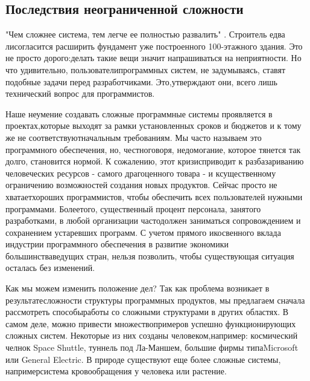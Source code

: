 \documentclass[10pt]{article}
\begin{document}
\subsection{Последствия неограниченной сложности}
"Чем сложнее система, тем легче ее полностью развалить" \cite{ The Peter Pyramid}. Строитель едва ли\linebreak согласится расширить фундамент уже построенного 100-этажного здания. Это не просто дорого:\linebreak делать такие вещи значит напрашиваться на неприятности. Но что удивительно, пользователи\linebreak программных систем, не задумываясь, ставят подобные задачи перед разработчиками. Это,\linebreak утверждают они, всего лишь технический вопрос для программистов. \vspace{3mm}

Наше неумение создавать сложные программные системы проявляется в проектах,\linebreak которые выходят за рамки установленных сроков и бюджетов и к тому же не соответствуют\linebreak начальным требованиям. Мы часто называем это { программного обеспечения,} но, честно\linebreak говоря, недомогание, которое тянется так долго, становится нормой. К сожалению, этот кризис\linebreak приводит к разбазариванию человеческих ресурсов - самого драгоценного товара - и к\linebreak существенному ограничению возможностей создания новых продуктов. Сейчас просто не хватает\linebreak хороших программистов, чтобы обеспечить всех пользователей нужными программами. Более\linebreak того, существенный процент персонала, занятого разработками, в любой организации часто\linebreak должен заниматься сопровождением и сохранением устаревших программ. С учетом прямого и\linebreak косвенного вклада индустрии программного обеспечения в развитие экономики большинства\linebreak ведущих стран, нельзя позволить, чтобы существующая ситуация осталась без изменений. \vspace{3mm}

Как мы можем изменить положение дел? Так как проблема возникает в результате\linebreak сложности структуры программных продуктов, мы предлагаем сначала рассмотреть способы\linebreak работы со сложными структурами в других областях. В самом деле, можно привести множество\linebreak примеров успешно функционирующих сложных систем. Некоторые из них созданы человеком,\linebreak например: космический челнок Space Shuttle, туннель под Ла-Маншем, большие фирмы типа\linebreak Microsoft или General Electric. В природе существуют еще более сложные системы, например\linebreak система кровообращения у человека или растение. 
\end{document}
